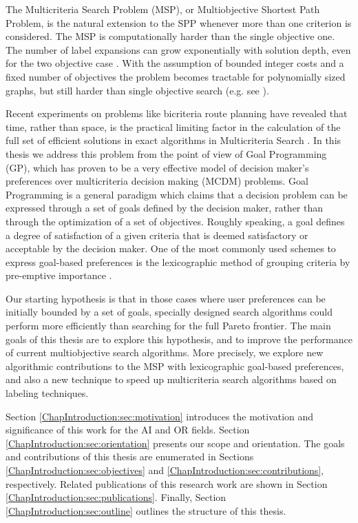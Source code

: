 The Multicriteria Search Problem (MSP), or Multiobjective Shortest Path Problem, is the natural extension to the SPP whenever more than one criterion is considered. The MSP is computationally harder than the single objective one. The number of label expansions can grow exponentially with solution depth, even for the two objective case \citep{hansen1979}. With the assumption of bounded integer costs and a fixed number of objectives the problem becomes tractable for polynomially sized graphs, but still harder than single objective search (e.g. see \citep{Mandow2009,Muller-Hannemann2006}).

Recent experiments on problems like bicriteria route planning have revealed that time, rather than space, is the practical limiting factor in the calculation of the full set of efficient solutions in exact algorithms in Multicriteria Search \citep{Machuca2011b, Machuca2009}. In this thesis we address this problem from the point of view of Goal Programming (GP), which has proven to be a very effective model of decision maker's preferences over multicriteria decision making (MCDM) problems. Goal Programming is a general paradigm which claims that a decision problem can be expressed through a set of goals defined by the decision maker, rather than through the optimization of a set of objectives. Roughly speaking, a goal defines a degree of satisfaction of a given criteria that is deemed satisfactory or acceptable by the decision maker. One of the most commonly used schemes to express goal-based preferences is the lexicographic method of grouping criteria by pre-emptive importance \citep{Charnes1977,Romero1991}.

Our starting hypothesis is that in those cases where user preferences can be initially bounded by a set of goals, specially designed search algorithms could perform more efficiently than searching for the full Pareto frontier. The main goals of this thesis are to explore this hypothesis, and to improve the performance of current multiobjective search algorithms. More precisely, we explore new algorithmic contributions to the MSP with lexicographic goal-based preferences, and also a new technique to speed up multicriteria search algorithms based on labeling techniques.    

Section \ref{ChapIntroduction:sec:motivation} introduces the motivation and significance of this work for the AI and OR fields. Section \ref{ChapIntroduction:sec:orientation} presents our scope and orientation. The goals and contributions of this thesis are enumerated in Sections \ref{ChapIntroduction:sec:objectives} and \ref{ChapIntroduction:sec:contributions}, respectively. Related publications of this research work are shown in Section \ref{ChapIntroduction:sec:publications}. Finally, Section \ref{ChapIntroduction:sec:outline} outlines the structure of this thesis.

